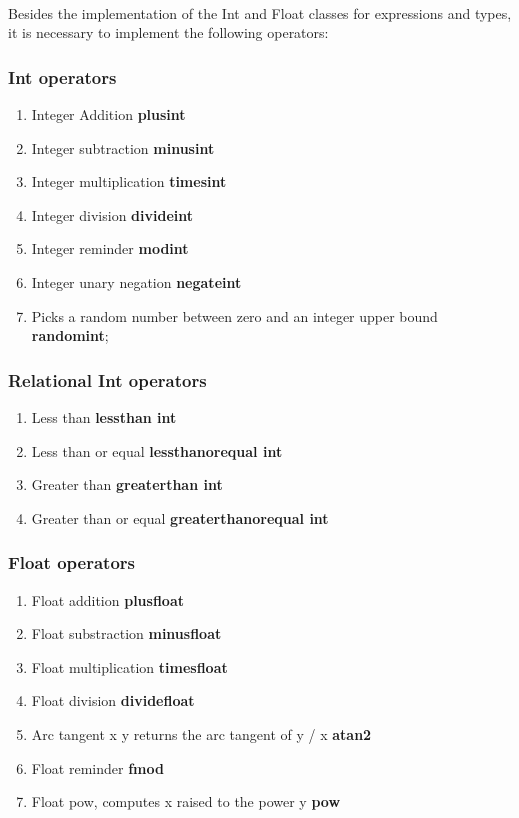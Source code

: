 \documentclass[12pt]{article}
\begin{document}
\paragraph{}
Besides the implementation of the Int and Float classes for expressions and types, 
it is necessary to implement  the following operators:

\subsubsection{Int operators}
\begin{enumerate}
\item  Integer Addition   		\textbf{plusint}
\item  Integer subtraction		\textbf{minusint}
\item  Integer multiplication   \textbf{timesint}
\item  Integer division         \textbf{divideint}
\item  Integer reminder         \textbf{modint}
\item  Integer unary negation   \textbf{negateint}
\item  Picks a random number between zero and an integer upper bound  \textbf{randomint};
\end{enumerate}

\subsubsection{Relational Int operators}
\begin{enumerate}
\item Less than   			  \textbf{lessthan int} 
\item Less than or equal   \textbf{lessthanorequal int} 
\item Greater than			  \textbf{greaterthan int} 
\item Greater than or equal  \textbf{greaterthanorequal int} 
\end{enumerate}

\subsubsection{Float operators}
\begin{enumerate}
\item  Float addition       \textbf{plusfloat} 
\item  Float substraction   \textbf{minusfloat} 
\item  Float multiplication \textbf{timesfloat} 
\item  Float division 		 \textbf{dividefloat} 
\item  Arc tangent x y returns the arc tangent of y / x \textbf{atan2}
\item  Float reminder   	\textbf{fmod} 
\item  Float pow, computes x raised to the power y  \textbf{pow}
\end{enumerate}
\end{document}

